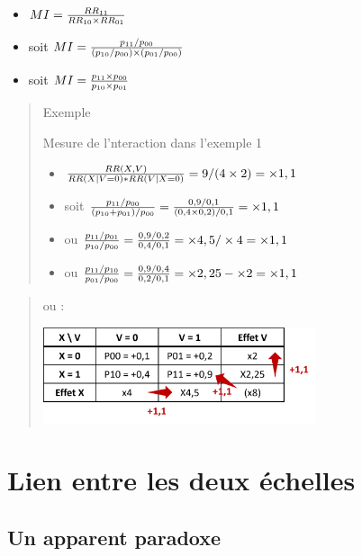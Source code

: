 \documentclass[
]{book}
\providecommand{\tightlist}{%
  \setlength{\itemsep}{0pt}\setlength{\parskip}{0pt}}
\begin{document}
\begin{itemize}
\tightlist
\item
  \(\small MI = \frac{RR_{11}}{RR_{10} \times RR_{01}}\)
\item
  soit \(\small MI = \frac{p_{11} / p_{00}}{(p_{10} / p_{00}) \times (p_{01} / p_{00})}\)
\item
  soit \(\small MI = \frac{p_{11} \times p_{00}}{p_{10} \times p_{01}}\)
\end{itemize}

\begin{quote}
Exemple

Mesure de l'nteraction dans l'exemple 1

\begin{itemize}
\tightlist
\item
  \(\small \frac{RR(X, V)}{RR(X| V=0)*RR(V|X=0)} = 9/(4 \times 2) = \times 1,1\)
\item
  soit \(\small\frac{p_{11} / p_{00}}{(p_{10} + p_{01}) / p_{00}} = \frac{0,9 / 0,1}{(0,4 \times 0,2) / 0,1} = \times 1,1\)
\item
  ou \(\small \frac{p_{11} / p_{01}}{p_{10} / p_{00}} = \frac{0,9 / 0,2}{0,4 / 0,1} = \times 4,5 / \times 4 = \times 1,1\)
\item
  ou \(\small \frac{p_{11} / p_{10}}{p_{01} / p_{00}} = \frac{0,9 / 0,4}{0,2 / 0,1} = \times 2,25 - \times 2 = \times 1,1\)
\end{itemize}
\end{quote}

\begin{quote}
ou :

\includegraphics[width=0.65\textwidth,height=\textheight]{img/Image3.png}
\end{quote}

\hypertarget{lien-entre-les-deux-uxe9chelles}{%
\section{Lien entre les deux échelles}\label{lien-entre-les-deux-uxe9chelles}}

\hypertarget{un-apparent-paradoxe}{%
\subsection*{Un apparent paradoxe}\label{un-apparent-paradoxe}}
\end{document}
